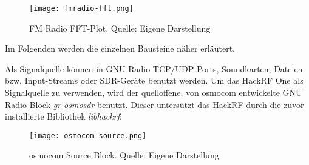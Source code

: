 \begin{figure}[ht]
	\centering
	\texttt{[image: fmradio-fft.png]}
	\caption[FM Radio FFT-Plot]{FM Radio FFT-Plot. Quelle: Eigene Darstellung} 
	\label{fmradio-fft}
\end{figure}

Im Folgenden werden die einzelnen Bausteine näher erläutert.


\newpage
Als Signalquelle können in GNU Radio TCP/UDP Ports, Soundkarten, Dateien bzw. Input-Streams oder \ac{SDR}-Geräte benutzt werden.\newline
Um das HackRF One als Signalquelle zu verwenden, wird der quelloffene, von \ac{osmocom} \cite{osmocom:2018} entwickelte GNU Radio Block \textit{gr-osmosdr} \cite{gr-osmosdr:2018} benutzt.
Dieser untersützt das HackRF durch die zuvor installierte Bibliothek \textit{libhackrf}:

\begin{figure}[ht]
	\centering
	\texttt{[image: osmocom-source.png]}
	\caption[osmocom Source Block]{osmocom Source Block. Quelle: Eigene Darstellung} 
	\label{osmocom-source}
\end{figure}

